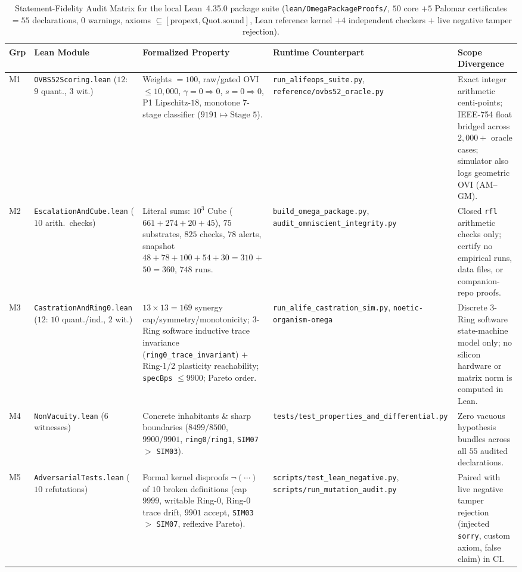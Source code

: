 \documentclass[11pt,reqno]{amsart}
\theoremstyle{plain}
\theoremstyle{definition}
\theoremstyle{remark}
\newcommand{\code}[1]{{\footnotesize\nolinkurl{#1}}}
\newcommand{\tcode}[1]{{\scriptsize\nolinkurl{#1}}}
\begin{document}
\begin{table}[t]
\centering
\caption{Statement-Fidelity Audit Matrix for the local Lean~4.35.0 package suite (\code{lean/OmegaPackageProofs/}, $50$ core $+ 5$ Palomar certificates $= 55$ declarations, $0$ warnings, axioms $\subseteq [\text{propext}, \text{Quot.sound}]$, Lean reference kernel $+ 4$ independent checkers $+$ live negative tamper rejection).}
\label{tab:fidelity}
\scriptsize
\setlength{\tabcolsep}{3.8pt}
\renewcommand{\arraystretch}{1.14}
\begin{tabularx}{\textwidth}{@{}P{0.68cm}P{2.55cm}YP{2.65cm}P{2.85cm}@{}}
\toprule
\textbf{Grp} & \textbf{Lean Module} & \textbf{Formalized Property} & \textbf{Runtime Counterpart} & \textbf{Scope Divergence} \\
\midrule
M1 & \tcode{OVBS52Scoring.lean} ($12$: $9$ quant., $3$ wit.) & Weights $=100$, raw/gated OVI $\le 10{,}000$, $\gamma=0 \Rightarrow 0$, $s=0 \Rightarrow 0$, P1 Lipschitz-$18$, monotone $7$-stage classifier ($9191 \mapsto \text{Stage 5}$). & \tcode{run_alifeops_suite.py}, \tcode{reference/ovbs52_oracle.py} & Exact integer arithmetic centi-points; IEEE-754 float bridged across $2{,}000+$ oracle cases; simulator also logs geometric OVI (AM--GM). \\
M2 & \tcode{EscalationAndCube.lean} ($10$ arith.\ checks) & Literal sums: $10^3$ Cube ($661+274+20+45$), $75$ substrates, $825$ checks, $78$ alerts, snapshot $48+78+100+54+30=310$ $+$ $50=360$, $748$ runs. & \tcode{build_omega_package.py}, \tcode{audit_omniscient_integrity.py} & Closed \tcode{rfl} arithmetic checks only; certify no empirical runs, data files, or companion-repo proofs. \\
M3 & \tcode{CastrationAndRing0.lean} ($12$: $10$ quant./ind., $2$ wit.) & $13{\times}13=169$ synergy cap/symmetry/monotonicity; 3-Ring software inductive trace invariance (\tcode{ring0_trace_invariant}) $+$ Ring-1/2 plasticity reachability; \tcode{specBps} $\le 9900$; Pareto order. & \tcode{run_alife_castration_sim.py}, \tcode{noetic-organism-omega} & Discrete 3-Ring software state-machine model only; no silicon hardware or matrix norm is computed in Lean. \\
M4 & \tcode{NonVacuity.lean} ($6$ witnesses) & Concrete inhabitants \& sharp boundaries ($8499/8500$, $9900/9901$, \tcode{ring0}/\tcode{ring1}, \tcode{SIM07} $>$ \tcode{SIM03}). & \tcode{tests/test_properties_and_differential.py} & Zero vacuous hypothesis bundles across all $55$ audited declarations. \\
M5 & \tcode{AdversarialTests.lean} ($10$ refutations) & Formal kernel disproofs $\neg(\cdots)$ of $10$ broken definitions (cap $9999$, writable Ring-0, Ring-0 trace drift, $9901$ accept, \tcode{SIM03} $>$ \tcode{SIM07}, reflexive Pareto). & \tcode{scripts/test_lean_negative.py}, \tcode{scripts/run_mutation_audit.py} & Paired with live negative tamper rejection (injected \tcode{sorry}, custom axiom, false claim) in CI. \\
\bottomrule
\end{tabularx}
\end{table}
\end{document}
